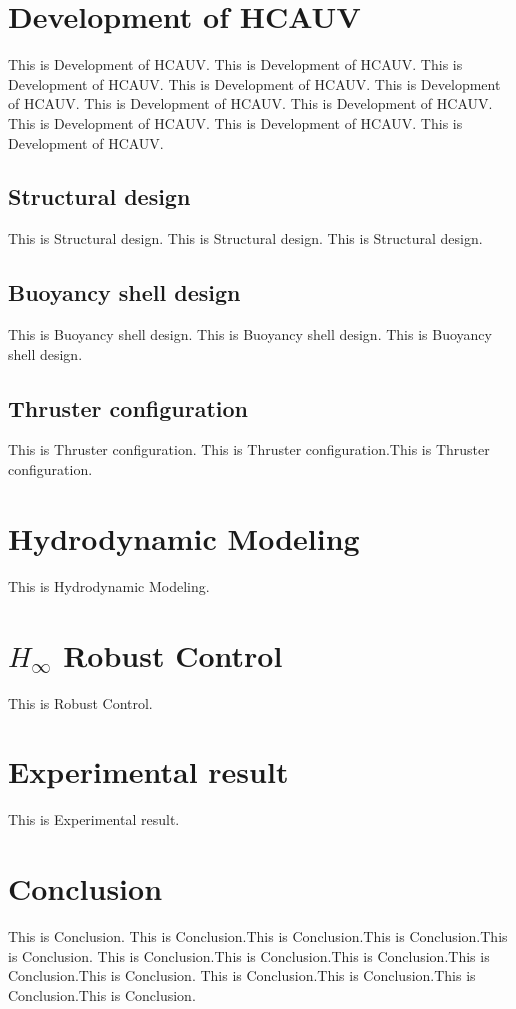 \documentclass[a4paper,fleqn]{cas-dc}
\begin{document}
\section{Development of HCAUV}
This is Development of HCAUV. This is Development of HCAUV. This is Development of HCAUV. This is Development of HCAUV.
This is Development of HCAUV. This is Development of HCAUV. This is Development of HCAUV. This is Development of HCAUV. 
This is Development of HCAUV. This is Development of HCAUV.  

\subsection{Structural design}
This is Structural design. This is Structural design. This is Structural design. 

\subsection{Buoyancy shell design}
This is Buoyancy shell design. This is Buoyancy shell design. This is Buoyancy shell design. 

\subsection{Thruster configuration}
This is Thruster configuration. This is Thruster configuration.This is Thruster configuration.


\section{Hydrodynamic Modeling}
This is Hydrodynamic Modeling.

\section{\emph{$H_\infty$} Robust Control}
This is Robust Control.

\section{Experimental result}
This is Experimental result.

\section{Conclusion}
This is Conclusion. This is Conclusion.This is Conclusion.This is Conclusion.This is Conclusion.
This is Conclusion.This is Conclusion.This is Conclusion.This is Conclusion.This is Conclusion.
This is Conclusion.This is Conclusion.This is Conclusion.This is Conclusion.
\end{document}
